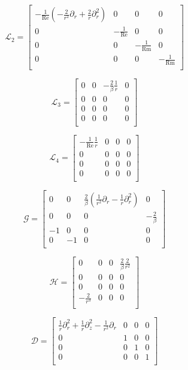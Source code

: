 \documentclass{emulateapj}
\newcommand{\beq}{\begin{equation}}
\newcommand{\eeq}{\end{equation}}
\newcommand\reye{\mathrm{Re}}
\newcommand\reym{\mathrm{Rm}}
\begin{document}
\beq
\mathcal{L}_2 = \left[\begin{matrix}
-\frac{1}{\reye} (-\frac{2}{r^2}\partial_r + \frac{2}{r}\partial_r^2) & 0 & 0 & 0 \\
0 & -\frac{1}{\reye} & 0 & 0 \\
0 & 0 & -\frac{1}{\reym} & 0 \\
0 & 0 & 0 & -\frac{1}{\reym} \\
\end{matrix}\right]
\eeq

\beq
\mathcal{L}_3 = \left[\begin{matrix}
0 & 0 & -\frac{2}{\beta}\frac{1}{r} & 0 \\
0 & 0 & 0 & 0 \\
0 & 0 & 0 & 0 \\
0 & 0 & 0 & 0 \\
\end{matrix}\right]
\eeq

\beq
\mathcal{L}_4 = \left[\begin{matrix}
-\frac{1}{\reye}\frac{1}{r} & 0 & 0 & 0 \\
0 & 0 & 0 & 0 \\
0 & 0 & 0 & 0 \\
0 & 0 & 0 & 0 \\
\end{matrix}\right]
\eeq

\beq
\mathcal{G} = \left[\begin{matrix}
0 & 0 & \frac{2}{\beta}(\frac{1}{r^2}\partial_r - \frac{1}{r}\partial_r^2) & 0 \\
0 & 0 & 0 & -\frac{2}{\beta} \\
-1 & 0 & 0 & 0 \\
0 & -1 & 0 & 0 \\
\end{matrix}\right]
\eeq

\beq
\mathcal{H} = \left[\begin{matrix}
0 & 0 & 0 & \frac{2}{\beta} \frac{2}{r^2} \\
0 & 0 & 0 & 0 \\
0 & 0 & 0 & 0 \\
-\frac{2}{r^3} & 0 & 0 & 0 \\
\end{matrix}\right]
\eeq

\beq
\mathcal{D} = \left[\begin{matrix}
\frac{1}{r}\partial_r^2 + \frac{1}{r}\partial_z^2 - \frac{1}{r^2}\partial_r & 0 & 0 & 0 \\
0 & 1 & 0 & 0 \\
0 & 0 & 1 & 0 \\
0 & 0 & 0 & 1 \\
\end{matrix}\right]
\eeq
\end{document}
